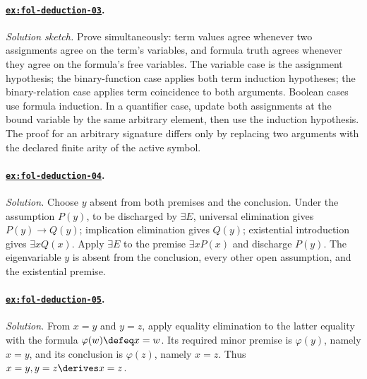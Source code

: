 \paragraph{\hyperref[ex:fol-deduction-03]{\texttt{ex:fol-deduction-03}}.}
\textit{Solution sketch.}  Prove simultaneously: term values agree whenever
two assignments agree on the term's variables, and formula truth agrees
whenever they agree on the formula's free variables.  The variable case is the
assignment hypothesis; the binary-function case applies both term induction
hypotheses; the binary-relation case applies term coincidence to both
arguments.  Boolean cases use formula induction.  In a quantifier case, update
both assignments at the bound variable by the same arbitrary element, then use
the induction hypothesis.  The proof for an arbitrary signature differs only
by replacing two arguments with the declared finite arity of the active symbol.

\paragraph{\hyperref[ex:fol-deduction-04]{\texttt{ex:fol-deduction-04}}.}
\textit{Solution.}  Choose \(y\) absent from both premises and the conclusion.
Under the assumption \(P(y)\), to be discharged by \(\exists E\),
universal elimination gives
\(P(y)\to Q(y)\); implication elimination gives \(Q(y)\); existential
introduction gives \(\exists xQ(x)\).  Apply \(\exists E\) to the premise
\(\exists xP(x)\) and discharge \(P(y)\).  The eigenvariable \(y\) is absent
from the conclusion, every other open assumption, and the existential premise.

\paragraph{\hyperref[ex:fol-deduction-05]{\texttt{ex:fol-deduction-05}}.}
\textit{Solution.}  From \(x=y\) and \(y=z\), apply equality elimination to
the latter equality with the formula \(\varphi(w)\defeq x=w\).  Its required
minor premise is \(\varphi(y)\), namely \(x=y\), and its conclusion is
\(\varphi(z)\), namely \(x=z\).  Thus \(x=y,y=z\derives x=z\).

